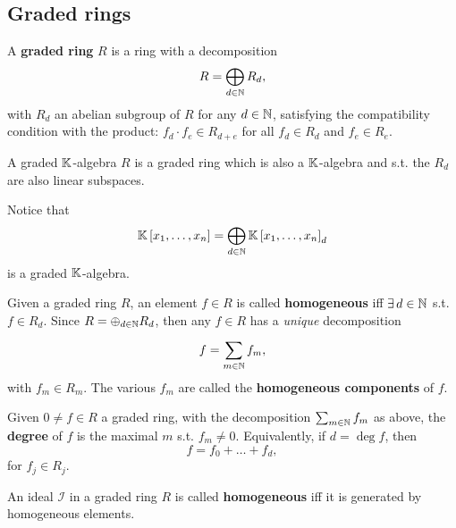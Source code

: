 \subsection{Graded rings}
\begin{defn}
	A \textbf{graded ring} $R$ is a ring with a decomposition
	\begin{equation}
	R = \bigoplus_{d \in \mathbb{N}} R_d
	,\end{equation} 
	with $R_d$ an abelian subgroup of $R$ for any $d \in \mathbb{N}$, satisfying the compatibility condition with the product:
	$f_d \cdot f_e \in R_{d+e}$ for all $f_d \in R_d$ and $f_e \in R_e$.
\end{defn}

\begin{defn}
	A graded $\mathbb{K}$-algebra $R$ is a graded ring which is also a $\mathbb{K}$-algebra and s.t. the $R_d$ are also linear subspaces.
\end{defn}

\begin{rem}
	Notice that 
	 \begin{equation}
	\mathbb{K}\left[x_1, \ldots, x_n \right] = \bigoplus_{d \in \mathbb{N}} \mathbb{K}\left[x_1, \ldots, x_n \right]_d
	\end{equation} 
	is a graded $\mathbb{K}$-algebra.
\end{rem}

\begin{defn}
	Given a graded ring $R$, an element $f \in R$ is called \textbf{homogeneous} iff $\exists\, d \in \mathbb{N}$ s.t. $f \in R_d$.
	Since $R = \oplus_{d \in \mathbb{N}} R_d$, then any $f \in R$ has a \textit{unique} decomposition
	\begin{equation}
	f = \sum_{m \in \mathbb{N}}^{}  f_m
	,\end{equation} 
	with $f_m \in R_m$.
	The various  $f_m$ are called the \textbf{homogeneous components} of $f$.
\end{defn}

\begin{defn}
	Given $0 \neq f \in R$ a graded ring, with the decomposition $\sum_{m \in \mathbb{N}}^{} f_m$ as above, the \textbf{degree} of $f$ is the maximal $m$ s.t. $f_m \neq 0$.
	Equivalently, if $d = \deg f$, then
	\begin{equation}
	f = f_0 + \ldots + f_d
	,\end{equation} 
	for $f_j \in R_j$.
\end{defn}

\begin{defn}
	An ideal $\mathcal{I}$ in a graded ring $R$ is called \textbf{homogeneous} iff it is generated by homogeneous elements.
\end{defn}

